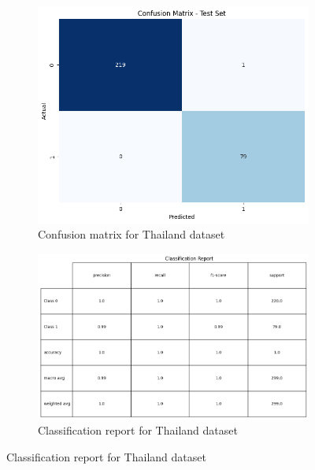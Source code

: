 \begin{figure}[!ht]
    \centering
    \begin{subfigure}{0.45\textwidth}
        \centering
        \includegraphics[width=\linewidth]{images/thai.cm.png}
        \caption{Confusion matrix for Thailand dataset}
    \end{subfigure}
    \hfill
    \begin{subfigure}{0.45\textwidth}
        \centering
        \includegraphics[width=\linewidth]{images/thai.cr.png}
        \caption{Classification report for Thailand dataset}
    \end{subfigure}
    
    \vspace{0.5cm} %
    

\end{figure}
